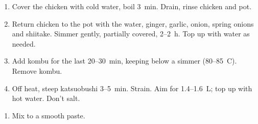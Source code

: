 


\begin{ingredients}
\end{ingredients}

\begin{recipe}
  \begin{enumerate}

  \item Cover the chicken with cold water, boil 3~min. Drain, rinse
    chicken and pot.

  \item Return chicken to the pot with the water, ginger, garlic,
    onion, spring onions and shiitake. Simmer gently, partially
    covered, 2--2\fracH~h. Top up with water as needed.

  \item Add kombu for the last 20--30~min, keeping below a simmer
    (80--85~\textdegree{}C). Remove kombu.

  \item Off heat, steep katsuobushi 3--5~min. Strain. Aim for
    1.4--1.6~L; top up with hot water. Don't salt.

  \end{enumerate}
\end{recipe}



\begin{ingredients}
\end{ingredients}

\begin{recipe}
  \begin{enumerate}

  \item Mix to a smooth paste.

  \end{enumerate}
\end{recipe}


